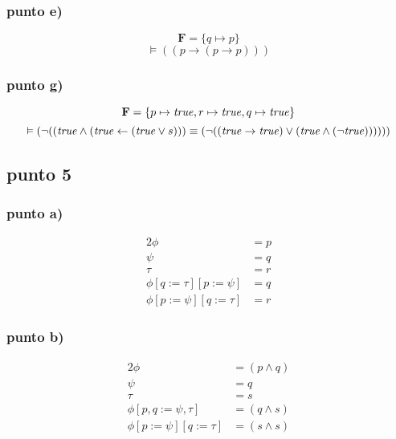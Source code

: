 \documentclass{article}
\newlength{\logicv}
\newenvironment{logicenv}[2][0]{
  \begin{tcolorbox}[demo, title = #2]
  \vspace*{#1\logicv}
}{
  \end{tcolorbox}
  \vspace*{-.5cm}
}
\begin{document}
\subsubsection{punto e)}

\begin{logicenv}{punto e)}
    $$\mathbf{F} = \{q \mapsto p\}$$
    $$ \vDash ((p \to (p \to p)))$$
\end{logicenv}

\subsubsection{punto g)}

\begin{logicenv}{punto g)}
    $$\mathbf{F} = \{p \mapsto \textrm{\textit{true}}, r \mapsto \textrm{\textit{true}}, q \mapsto \textrm{\textit{true}}\}$$
    $$\vDash (\neg((\textrm{\textit{true}} \land (\textrm{\textit{true}} \gets (\textrm{\textit{true}} \lor s))) \equiv (\neg ((\textrm{\textit{true}} \to \textrm{\textit{true}}) \lor (\textrm{\textit{true}} \land (\neg \textrm{\textit{true}}))))))$$
\end{logicenv}

\subsection{punto 5}

\subsubsection{punto a)}

\begin{logicenv}{punto a)}
    \begin{alignat*}{2}
        \phi &= p\\
        \psi &= q\\
        \tau &= r\\
        \phi[q := \tau][p := \psi] &= q\\
        \phi[p := \psi][q := \tau] &= r
    \end{alignat*}
\end{logicenv}

\subsubsection{punto b)}

\begin{logicenv}{punto b)}
    \begin{alignat*}{2}
        \phi &= (p \land q)\\
        \psi &= q\\
        \tau &= s\\
        \phi[p, q := \psi, \tau] &= (q \land s)\\
        \phi[p := \psi][q := \tau] &= (s \land s)
    \end{alignat*}
\end{logicenv}
\end{document}
